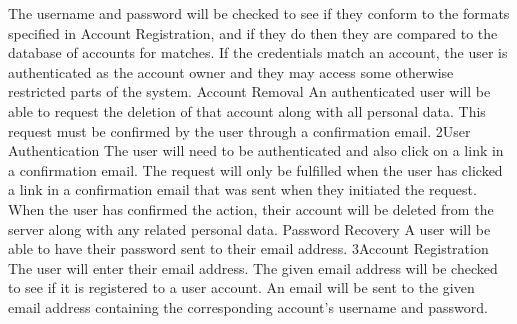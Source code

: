 			{The username and password will be checked to see if they conform to the formats specified in Account Registration, and if they do then they are compared to the database of accounts for matches.}
			{If the credentials match an account, the user is authenticated as the account owner and they may access some otherwise restricted parts of the system.}
		\funcreq
			{Account Removal}
			{An authenticated user will be able to request the deletion of that account along with all personal data. This request must be confirmed by the user through a confirmation email.}
			{2}{User Authentication}
			{The user will need to be authenticated and also click on a link in a confirmation email.}
			{The request will only be fulfilled when the user has clicked a link in a confirmation email that was sent when they initiated the request.}
			{When the user has confirmed the action, their account will be deleted from the server along with any related personal data.}
		\funcreq
			{Password Recovery}
			{A user will be able to have their password sent to their email address.}
			{3}{Account Registration}
			{The user will enter their email address.}
			{The given email address will be checked to see if it is registered to a user account.}
			{An email will be sent to the given email address containing the corresponding account's username and password.}
